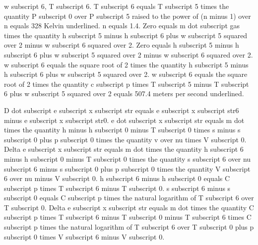 w subscript 6, T subscript 6. T subscript 6 equals T subscript 5 times the quantity P subscript 0 over P subscript 5 raised to the power of (n minus 1) over n equals 328 Kelvin underlined. n equals 1.4. Zero equals m dot subscript gas times the quantity h subscript 5 minus h subscript 6 plus w subscript 5 squared over 2 minus w subscript 6 squared over 2. Zero equals h subscript 5 minus h subscript 6 plus w subscript 5 squared over 2 minus w subscript 6 squared over 2. w subscript 6 equals the square root of 2 times the quantity h subscript 5 minus h subscript 6 plus w subscript 5 squared over 2. w subscript 6 equals the square root of 2 times the quantity c subscript p times T subscript 5 minus T subscript 6 plus w subscript 5 squared over 2 equals 507.4 meters per second underlined.

D dot subscript e subscript x subscript str equals e subscript x subscript str6 minus e subscript x subscript str0. e dot subscript x subscript str equals m dot times the quantity h minus h subscript 0 minus T subscript 0 times s minus s subscript 0 plus p subscript 0 times the quantity v over nu times V subscript 0. Delta e subscript x subscript str equals m dot times the quantity h subscript 6 minus h subscript 0 minus T subscript 0 times the quantity s subscript 6 over nu subscript 6 minus s subscript 0 plus p subscript 0 times the quantity V subscript 6 over nu minus V subscript 0. h subscript 6 minus h subscript 0 equals C subscript p times T subscript 6 minus T subscript 0. s subscript 6 minus s subscript 0 equals C subscript p times the natural logarithm of T subscript 6 over T subscript 0. Delta e subscript x subscript str equals m dot times the quantity C subscript p times T subscript 6 minus T subscript 0 minus T subscript 6 times C subscript p times the natural logarithm of T subscript 6 over T subscript 0 plus p subscript 0 times V subscript 6 minus V subscript 0.